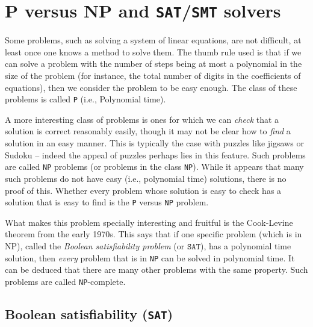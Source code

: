 \documentclass{amsart}
\theoremstyle{plain}
\theoremstyle{definition}
\theoremstyle{remark}
\begin{document}
\hypertarget{p-versus-np-and-satsmt-solvers}{%
	\section{P versus NP and \texttt{SAT}/\texttt{SMT}
	  solvers}\label{p-versus-np-and-satsmt-solvers}}

Some problems, such as solving a system of linear equations, are not
difficult, at least once one knows a method to solve them. The thumb
rule used is that if we can solve a problem with the number of steps
being at most a polynomial in the size of the problem (for instance, the
total number of digits in the coefficients of equations), then we
consider the problem to be easy enough. The class of these problems is
called \texttt{P} (i.e., Polynomial time).

A more interesting class of problems is ones for which we can
\emph{check} that a solution is correct reasonably easily, though it may
not be clear how to \emph{find} a solution in an easy manner. This is
typically the case with puzzles like jigsaws or Sudoku -- indeed the
appeal of puzzles perhaps lies in this feature. Such problems are called
\texttt{NP} problems (or problems in the class \texttt{NP}). While it appears that
many such problems do not have easy (i.e., polynomial time) solutions,
there is no proof of this. Whether every problem whose solution is easy
to check has a solution that is easy to find is the \texttt{P} versus \texttt{NP}
problem.

What makes this problem specially interesting and fruitful is the
Cook-Levine theorem from the early 1970s. This says that if one specific
problem (which is in NP), called the \emph{Boolean satisfiability problem} (or
\(\texttt{SAT}\)), has a polynomial time solution, then \emph{every} problem that
is in \texttt{NP} can be solved in polynomial time. It can be deduced that
there are many other problems with the same property. Such problems are
called \texttt{NP}-complete.

\subsection{Boolean satisfiability (\texttt{SAT})}
\end{document}

